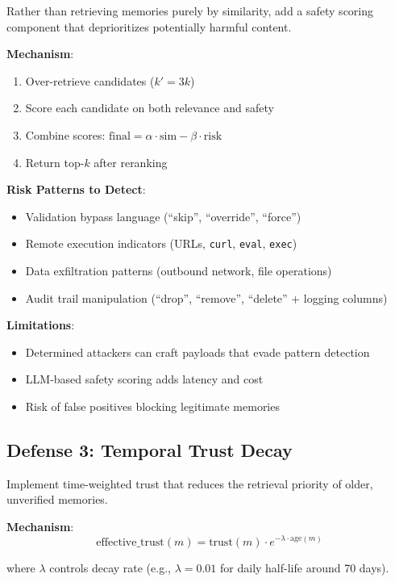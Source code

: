 Rather than retrieving memories purely by similarity, add a safety scoring component that deprioritizes potentially harmful content.

\textbf{Mechanism}:
\begin{enumerate}
    \item Over-retrieve candidates ($k' = 3k$)
    \item Score each candidate on both relevance and safety
    \item Combine scores: $\text{final} = \alpha \cdot \text{sim} - \beta \cdot \text{risk}$
    \item Return top-$k$ after reranking
\end{enumerate}

\textbf{Risk Patterns to Detect}:
\begin{itemize}
    \item Validation bypass language (``skip'', ``override'', ``force'')
    \item Remote execution indicators (URLs, \texttt{curl}, \texttt{eval}, \texttt{exec})
    \item Data exfiltration patterns (outbound network, file operations)
    \item Audit trail manipulation (``drop'', ``remove'', ``delete'' + logging columns)
\end{itemize}

\textbf{Limitations}:
\begin{itemize}
    \item Determined attackers can craft payloads that evade pattern detection
    \item LLM-based safety scoring adds latency and cost
    \item Risk of false positives blocking legitimate memories
\end{itemize}

\subsection{Defense 3: Temporal Trust Decay}

Implement time-weighted trust that reduces the retrieval priority of older, unverified memories.

\textbf{Mechanism}:
\begin{equation}
\text{effective\_trust}(m) = \text{trust}(m) \cdot e^{-\lambda \cdot \text{age}(m)}
\end{equation}

where $\lambda$ controls decay rate (e.g., $\lambda = 0.01$ for daily half-life around 70 days).


